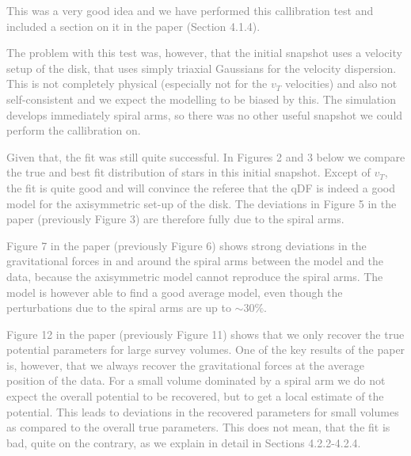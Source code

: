 \documentclass[10pt,a4paper]{article}
\newcommand{\Answer}[1]{\textcolor{Gray}{#1}}
\begin{document}
\Answer{This was a very good idea and we have performed this callibration test and included a section on it in the paper (Section 4.1.4).}

\Answer{The problem with this test was, however, that the initial snapshot uses a velocity setup of the disk, that uses simply triaxial Gaussians for the velocity dispersion. This is not completely physical (especially not for the $v_T$ velocities) and also not self-consistent and we expect the modelling to be biased by this. The simulation develops immediately spiral arms, so there was no other useful snapshot we could perform the callibration on.}

\Answer{Given that, the fit was still quite successful. In Figures 2 and 3 below we compare the true and best fit distribution of stars in this initial snapshot. Except of $v_T$, the fit is quite good and will convince the referee that the qDF is indeed a good model for the axisymmetric set-up of the disk. The deviations in Figure 5 in the paper (previously Figure 3) are therefore fully due to the spiral arms.}

\Answer{Figure 7 in the paper (previously Figure 6) shows strong deviations in the gravitational forces in and around the spiral arms between the model and the data, because the axisymmetric model cannot reproduce the spiral arms. The model is however able to find a good average model, even though the perturbations due to the spiral arms are up to $\sim30\%$.}

\Answer{Figure 12 in the paper (previously Figure 11) shows that we only recover the true potential parameters for large survey volumes. One of the key results of the paper is, however, that we always recover the gravitational forces at the average position of the data. For a small volume dominated by a spiral arm we do not expect the overall potential to be recovered, but to get a local estimate of the potential. This leads to deviations in the recovered parameters for small volumes as compared to the overall true parameters. This does not mean, that the fit is bad, quite on the contrary, as we explain in detail in Sections 4.2.2-4.2.4.}
\end{document}
